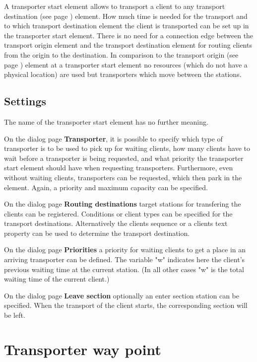 A transporter start element allows to transport a client to any
transport destination (see page \pageref{ref:ModelElementTransportDestination}) 
element. How much time is needed for the transport and to which
transport destination element the client is transported can be set up
in the transporter start element. 
There is no need for a connection edge between the transport origin element
and the transport destination element for routing clients from the origin to the
destination.
In comparison to the  transport origin (see page \pageref{ref:ModelElementTransportSource}) 
element at a transporter start element no resources (which do not have a physical location)
are used but transporters which move between the stations.

\subsection*{Settings}

The name of the transporter start element has no further meaning.

On the dialog page \textbf{Transporter}, it is possible to specify which type
of transporter is to be used to pick up for waiting clients, how many clients
have to wait before a transporter is being requested, and what priority the
transporter start element should have when requesting transporters.
Furthermore, even without waiting clients, transporters can be requested,
which then park in the element. Again, a priority and maximum capacity can be specified.

On the dialog page \textbf{Routing destinations} target stations for transfering the
clients can be registered. Conditions or client types can be specified for the transport
destinations. Alternatively the clients sequence or a clients text property can be used to determine
the transport destination.

On the dialog page \textbf{Priorities} a priority for waiting clients
to get a place in an arriving transporter can be defined.
The variable "w" indicates here the client's previous waiting time at the current station.
(In all other cases "w" is the total waiting time of the current client.)

On the dialog page \textbf{Leave section} optionally an enter section station can be specified.
When the transport of the client starts, the corresponding section will be left.


\section{Transporter way point}
\label{ref:ModelElementWayPoint}

